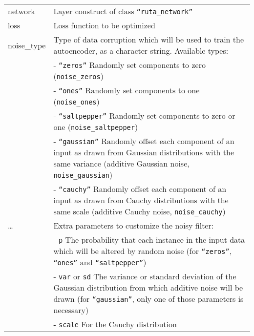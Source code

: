 \begin{longtable}[c]{@{}>{\small}p{3cm}>{\raggedright}p{12.5cm}@{}}
\toprule

network
 &

Layer construct of class \texttt{``ruta\_network''}
\tabularnewline

loss
 &

Loss function to be optimized
\tabularnewline

noise\_type
 &

Type of data corruption which will be used to train the autoencoder, as
a character string. Available types:
\tabularnewline

 &

- \texttt{``zeros''} Randomly set components to zero
(\texttt{noise\_zeros})
\tabularnewline

 &

- \texttt{``ones''} Randomly set components to one (\texttt{noise\_ones})
\tabularnewline

 &

- \texttt{``saltpepper''} Randomly set components to zero or one
(\texttt{noise\_saltpepper})
\tabularnewline

 &

- \texttt{``gaussian''} Randomly offset each component of an input as
drawn from Gaussian distributions with the same variance (additive
Gaussian noise, \texttt{noise\_gaussian})
\tabularnewline

 &

- \texttt{``cauchy''} Randomly offset each component of an input as drawn
from Cauchy distributions with the same scale (additive Cauchy noise,
\texttt{noise\_cauchy})
\tabularnewline

\ldots{}
 &

Extra parameters to customize the noisy filter:
\tabularnewline

 &

- \texttt{p} The probability that each instance in the input data which
will be altered by random noise (for \texttt{``zeros''}, \texttt{``ones''}
and \texttt{``saltpepper''})
\tabularnewline

 &

- \texttt{var} or \texttt{sd} The variance or standard deviation of the
Gaussian distribution from which additive noise will be drawn (for
\texttt{``gaussian''}, only one of those parameters is necessary)
\tabularnewline

 &

- \texttt{scale} For the Cauchy distribution
\tabularnewline
\bottomrule
\end{longtable}

